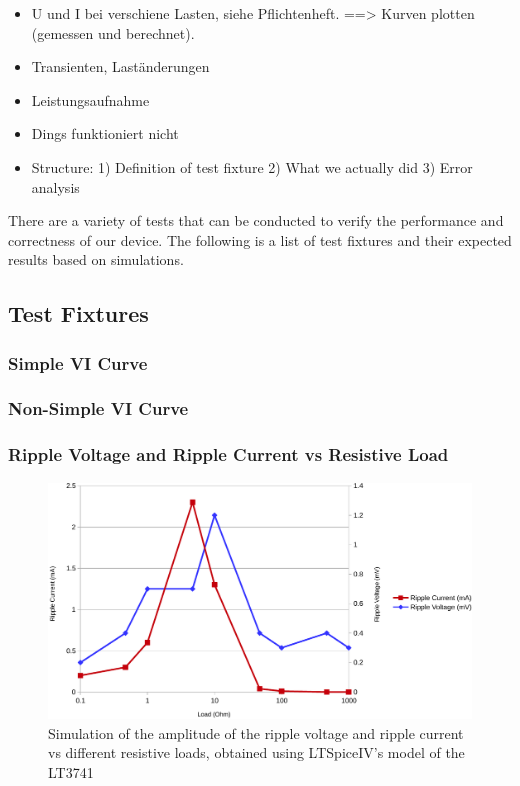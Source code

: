 \begin{itemize}
    \item
        U und I bei verschiene Lasten, siehe Pflichtenheft.
            ==> Kurven plotten (gemessen und berechnet).
    \item
        Transienten, Laständerungen
    \item
        Leistungsaufnahme
    \item
        Dings funktioniert nicht
    \item
        Structure:
            1) Definition of test fixture
            2) What we actually did
            3) Error analysis
\end{itemize}


There are a variety of tests that can be conducted to verify the performance and
correctness of our  device.  The  following is a list of test fixtures and their
expected results based on simulations.

\subsection{Test Fixtures}

\subsubsection{Simple VI Curve}


\subsubsection{Non-Simple VI Curve}


\subsubsection{Ripple Voltage and Ripple Current vs Resistive Load}

\begin{figure}[th!]
    \centering
    \includegraphics[width=.7\textwidth]{images/sim/ripple-vs-load.pdf}
    \caption{Simulation of the amplitude of the ripple voltage and ripple current vs different resistive loads, obtained using LTSpiceIV's model of the LT3741}
\end{figure}


